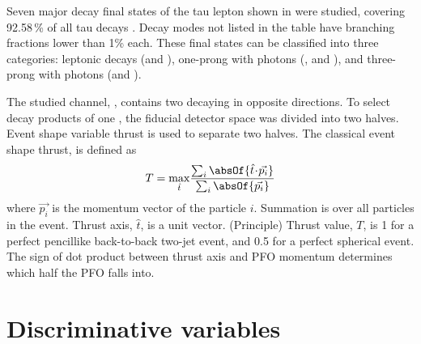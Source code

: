 Seven major decay final states of the tau lepton shown in  were studied, covering 92.58\,\% of all tau decays  \cite{Agashe:2014kda}.  Decay modes not listed in the table have branching fractions lower than 1\% each. These final states can be classified into three categories: leptonic decays (\decayElectron and \decayMuon), one-prong with photons (\decayPion, \decayRho and \decayAiPhoton), and three-prong with photons (\decayAiPion and \decayThreePionPhoton).

The studied channel, \eeToTauTau, contains two \Pgt decaying in opposite directions. To select decay products of one \Ptau, the fiducial detector space was divided into two halves. %
Event shape variable thrust is used to separate two halves. The classical event shape thrust\cite{PhysRevLett.39.1587}, is defined as
\begin{equation}
T = \max_{\hat{t}}\!\frac{\sum_{i}\absOf{\hat{t}\!\cdot\!\vec{p_{i}}}}{\sum_{i}\absOf{\vec{p_{i}}}}
\end{equation}
where $\vec{p_{i}}$ is the momentum vector of the particle $i$. Summation is over all particles in the event. Thrust axis, $\hat{t}$, is a unit vector. (Principle) Thrust value, $T$, is 1 for a perfect pencillike back-to-back two-jet event, and 0.5 for a perfect spherical event. The sign of dot product between thrust axis and PFO momentum determines which half the PFO falls into.


\section{Discriminative variables}

